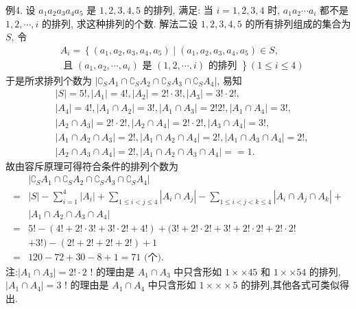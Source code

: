 例4. 设 $a_1 a_2 a_3 a_4 a_5$ 是 $1,2,3,4,5$ 的排列, 满足: 当 $i=1,2,3,4$ 时, $a_1 a_2 \cdots a_i$ 都不是 $1,2, \cdots, i$ 的排列, 求这种排列的个数.
解法二设 $1,2,3,4,5$ 的所有排列组成的集合为 $S$, 令
$$
\begin{aligned}
& A_i=\left\{\left(a_1, a_2, a_3, a_4, a_5\right) \mid\left(a_1, a_2, a_3, a_4, a_5\right) \in S,\right. \\
& \text { 且 } \left.\left(a_1, a_2, \cdots, a_i\right) \text { 是 }(1,2, \cdots, i) \text { 的排列 }\right\}(1 \leqslant i \leqslant 4)
\end{aligned}
$$
于是所求排列个数为 $\left|\complement_S A_1 \cap \complement_S A_2 \cap \complement_S A_3 \cap \complement_S A_4\right|$, 易知
$$
\begin{aligned}
& |S|=5 !,\left|A_1\right|=4 !,\left|A_2\right|=2 ! \cdot 3 !,\left|A_3\right|=3 ! \cdot 2 !, \\
& \left|A_4\right|=4 !,\left|A_1 \cap A_2\right|=3 !,\left|A_1 \cap A_3\right|=2 ! 2 !,\left|A_1 \cap A_4\right|=3 !, \\
& \left|A_2 \cap A_3\right|=2 ! \cdot 2 !,\left|A_2 \cap A_4\right|=2 ! \cdot 2 !,\left|A_3 \cap A_4\right|=3 !, \\
& \left|A_1 \cap A_2 \cap A_3\right|=2 !,\left|A_1 \cap A_2 \cap A_4\right|=2 !,\left|A_1 \cap A_3 \cap A_4\right|=2 !, \\
& \left|A_2 \cap A_3 \cap A_4\right|=2 !,\left|A_1 \cap A_2 \cap A_3 \cap A_4\right|==1 .
\end{aligned}
$$
故由容斥原理可得符合条件的排列个数为
$$
\begin{aligned}
& \left|\complement_S A_1 \cap \complement_S A_2 \cap \complement_S A_3 \cap \complement_S A_4\right| \\
= & |S|-\sum_{i=1}^4\left|A_i\right|+\sum_{1 \leqslant i<j \leqslant 4}\left|A_i \cap A_j\right|-\sum_{1 \leqslant i<j<k \leqslant 4}\left|A_i \cap A_j \cap A_k\right|+ \\
& \left|A_1 \cap A_2 \cap A_3 \cap A_4\right| \\
= & 5 !-(4 !+2 ! \cdot 3 !+3 ! \cdot 2 !+4 !)+(3 !+2 ! \cdot 2 !+3 !+2 ! \cdot 2 !+2 ! \cdot 2 ! \\
& +3 !)-(2 !+2 !+2 !+2 !)+1 \\
= & 120-72+30-8+1=71 \text { (个). }
\end{aligned}
$$
注:$\left|A_1 \cap A_3\right|=2 ! \cdot 2$ ! 的理由是 $A_1 \cap A_3$ 中只含形如 $1 \times \times 45$ 和 $1 \times \times 54$ 的排列, $\left|A_1 \cap A_4\right|=3$ ! 的理由是 $A_1 \cap A_4$ 中只含形如 $1 \times \times \times 5$ 的排列,其他各式可类似得出.



